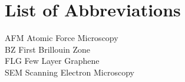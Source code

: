 \chapter*{List of Abbreviations}

\noindent

AFM \hfill Atomic Force Microscopy \\

BZ \hfill First Brillouin Zone \\

FLG \hfill Few Layer Graphene \\

SEM \hfill Scanning Electron Microscopy \\

\newpage
